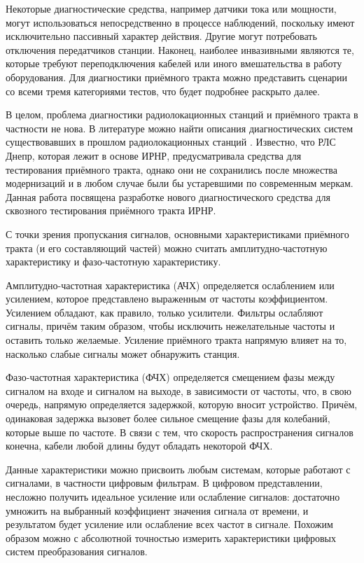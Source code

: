 \documentclass{report}
\begin{document}
Некоторые диагностические средства, например датчики тока или мощности, могут использоваться непосредственно в процессе наблюдений, поскольку имеют исключительно пассивный характер действия. Другие могут потребовать отключения передатчиков станции. Наконец, наиболее инвазивными являются те, которые требуют переподключения кабелей или иного вмешательства в работу оборудования. Для диагностики приёмного тракта можно представить сценарии со всеми тремя категориями тестов, что будет подробнее раскрыто далее.

В целом, проблема диагностики радиолокационных станций и приёмного тракта в частности не нова. В литературе можно найти описания диагностических систем существовавших в прошлом радиолокационных станций \cite{abm}. Известно, что РЛС Днепр, которая лежит в основе ИРНР, предусматривала средства для тестирования приёмного тракта, однако они не сохранились после множества модернизаций и в любом случае были бы устаревшими по современным меркам. Данная работа посвящена разработке нового диагностического средства для сквозного тестирования приёмного тракта ИРНР.

С точки зрения пропускания сигналов, основными характеристиками  приёмного тракта (и его составляющий частей) можно считать амплитудно-частотную характеристику и фазо-частотную характеристику.

Амплитудно-частотная характеристика (АЧХ) определяется ослаблением или усилением, которое представлено выраженным от частоты коэффициентом. Усилением обладают, как правило, только усилители. Фильтры ослабляют сигналы, причём таким образом, чтобы исключить нежелательные частоты и оставить только желаемые. Усиление приёмного тракта напрямую влияет на то, насколько слабые сигналы может обнаружить станция.

Фазо-частотная характеристика (ФЧХ) определяется смещением фазы между сигналом на входе и сигналом на выходе, в зависимости от частоты, что, в свою очередь, напрямую определяется задержкой, которую вносит устройство. Причём, одинаковая задержка вызовет более сильное смещение фазы для колебаний, которые выше по частоте. В связи с тем, что скорость распространения сигналов конечна, кабели любой длины будут обладать некоторой ФЧХ.


Данные характеристики можно присвоить любым системам, которые работают с сигналами, в частности цифровым фильтрам. В цифровом представлении, несложно получить идеальное усиление или ослабление сигналов: достаточно умножить на выбранный коэффициент значения сигнала от времени, и результатом будет усиление или ослабление всех частот в сигнале. Похожим образом можно с абсолютной точностью измерить характеристики цифровых систем преобразования сигналов.
\end{document}
